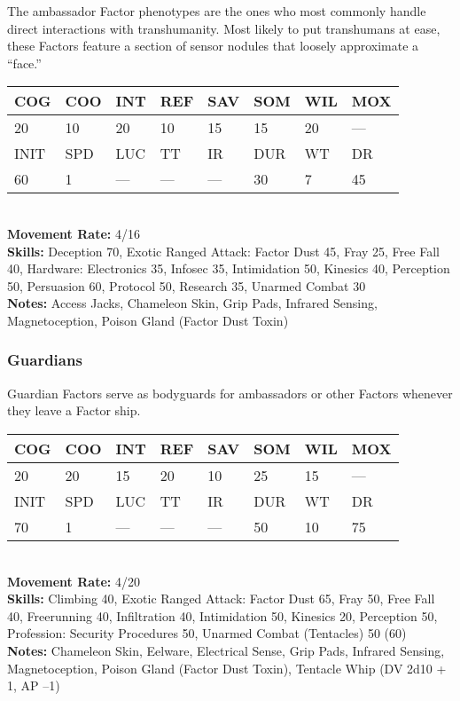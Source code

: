  The ambassador Factor phenotypes are the ones who most commonly handle direct interactions with transhumanity. Most likely to put transhumans at ease, these Factors feature a section of sensor nodules that loosely approximate a ``face.'' \\ \begin{tabular}{|l|l|l|l|l|l|l|l|} \hline

COG &COO &INT &REF &SAV &SOM &WIL &MOX \\ \hline

20 &10 &20 &10 &15 &15 &20 &— \\ \hline

INIT &SPD &LUC &TT &IR &DUR &WT &DR \\ \hline

60 &1 &— &— &— &30 &7 &45 \\ \hline

\end{tabular} \\ \textbf{Movement Rate: }4/16 \\ \textbf{Skills:} Deception 70, Exotic Ranged Attack: Factor Dust 45, Fray 25, Free Fall 40, Hardware: Electronics 35, Infosec 35, Intimidation 50, Kinesics 40, Perception 50, Persuasion 60, Protocol 50, Research 35, Unarmed Combat 30 \\ \textbf{Notes: }Access Jacks, Chameleon Skin, Grip Pads, Infrared Sensing, Magnetoception, Poison Gland (Factor Dust Toxin) 



\subsubsection{Guardians} 

Guardian Factors serve as bodyguards for ambassadors or other Factors whenever they leave a Factor ship. \\ \begin{tabular}{|l|l|l|l|l|l|l|l|} \hline

COG &COO &INT &REF &SAV &SOM &WIL &MOX \\ \hline

20 &20 &15 &20 &10 &25 &15 &— \\ \hline

INIT &SPD &LUC &TT &IR &DUR &WT &DR \\ \hline

70 &1 &— &— &— &50 &10 &75 \\ \hline

\end{tabular} \\ \textbf{Movement Rate: }4/20 \\ \textbf{Skills:} Climbing 40, Exotic Ranged Attack: Factor Dust 65, Fray 50, Free Fall 40, Freerunning 40, Infiltration 40, Intimidation 50, Kinesics 20, Perception 50, Profession: Security Procedures 50, Unarmed Combat (Tentacles) 50 (60) \\ \textbf{Notes:} Chameleon Skin, Eelware, Electrical Sense, Grip Pads, Infrared Sensing, Magnetoception, Poison Gland (Factor Dust Toxin), Tentacle Whip (DV 2d10 + 1, AP –1) 



